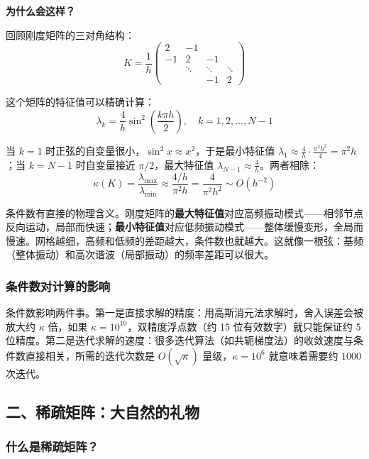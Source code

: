 \textbf{为什么会这样？}

回顾刚度矩阵的三对角结构：
\[
K = \frac{1}{h}
\begin{pmatrix}
2 & -1 & & \\
-1 & 2 & -1 & \\
& \ddots & \ddots & \ddots \\
& & -1 & 2
\end{pmatrix}
\]

这个矩阵的特征值可以精确计算：
\begin{equation}
\lambda_k = \frac{4}{h} \sin^2\left(\frac{k\pi h}{2}\right), \quad k = 1, 2, \ldots, N-1
\end{equation}

当 $k = 1$ 时正弦的自变量很小，$\sin^2 x \approx x^2$，于是最小特征值 $\lambda_1 \approx \frac{4}{h} \cdot \frac{\pi^2 h^2}{4} = \pi^2 h$；当 $k = N-1$ 时自变量接近 $\pi/2$，最大特征值 $\lambda_{N-1} \approx \frac{4}{h}$。两者相除：
\[
\kappa(K) = \frac{\lambda_{\max}}{\lambda_{\min}} \approx \frac{4/h}{\pi^2 h} = \frac{4}{\pi^2 h^2} \sim O(h^{-2})
\]

\begin{physicalmeaning}
条件数有直接的物理含义。刚度矩阵的\textbf{最大特征值}对应高频振动模式——相邻节点反向运动，局部而快速；\textbf{最小特征值}对应低频振动模式——整体缓慢变形，全局而慢速。网格越细，高频和低频的差距越大，条件数也就越大。这就像一根弦：基频（整体振动）和高次谐波（局部振动）的频率差距可以很大。
\end{physicalmeaning}

\subsubsection*{条件数对计算的影响}

条件数影响两件事。第一是直接求解的精度：用高斯消元法求解时，舍入误差会被放大约 $\kappa$ 倍，如果 $\kappa = 10^{10}$，双精度浮点数（约 15 位有效数字）就只能保证约 5 位精度。第二是迭代求解的速度：很多迭代算法（如共轭梯度法）的收敛速度与条件数直接相关，所需的迭代次数是 $O(\sqrt{\kappa})$ 量级，$\kappa = 10^6$ 就意味着需要约 $1000$ 次迭代。

\subsection*{二、稀疏矩阵：大自然的礼物}

\subsubsection*{什么是稀疏矩阵？}

